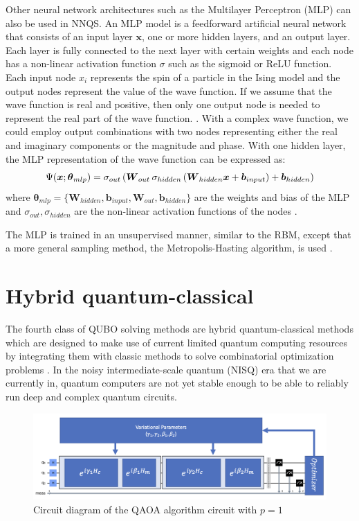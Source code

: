 Other neural network architectures such as the Multilayer Perceptron (MLP) can also be used in NNQS. An MLP model is a feedforward artificial neural network that consists of an input layer $\boldsymbol{x}$, one or more hidden layers, and an output layer. Each layer is fully connected to the next layer with certain weights and each node has a non-linear activation function $\sigma$ such as the sigmoid or ReLU function. Each input node $x_i$ represents the spin of a particle in the Ising model and the output nodes represent the value of the wave function. If we assume that the wave function is real and positive, then only one output node is needed to represent the real part of the wave function. \cite{b20}. With a complex wave function, we could employ output combinations with two nodes representing either the real and imaginary components or the magnitude and phase. With one hidden layer, the MLP representation of the wave function can be expressed as:
\begin{equation}
    \Psi(\boldsymbol{x}; \boldsymbol{\theta}_{mlp}) = 
    \sigma_{out} \left(
    \boldsymbol{W}_{out} \hspace{2px}
    \sigma_{hidden} \left( \boldsymbol{W}_{hidden}\boldsymbol{x} + \boldsymbol{b}_{input} \right) + \boldsymbol{b}_{hidden} \right)
\end{equation}
where  $\boldsymbol{\theta}_{mlp} = \{\boldsymbol{W}_{hidden}, \boldsymbol{b}_{input}, \boldsymbol{W}_{out}, \boldsymbol{b}_{hidden}\}$ are the weights and bias of the MLP and $\sigma_{out}, \sigma_{hidden}$ are the non-linear activation functions of the nodes \cite{b20}. 

The MLP is trained in an unsupervised manner, similar to the RBM, except that a more general sampling method, the Metropolis-Hasting algorithm, is used \cite{b25}.

\section{Hybrid quantum-classical}
The fourth class of QUBO solving methods are hybrid quantum-classical methods which are designed to make use of current limited quantum computing resources by integrating them with classic methods to solve combinatorial optimization problems \cite{b32}. In the noisy intermediate-scale quantum (NISQ) era that we are currently in, quantum computers are not yet stable enough to be able to reliably run deep and complex quantum circuits. 

\begin{figure}[h!]
    \centering
    \includegraphics[width=\linewidth]{images/qaoa_circuit.png}
    \caption{Circuit diagram of the QAOA algorithm circuit with $p=1$}
    \label{qaoacircuit}
\end{figure}

